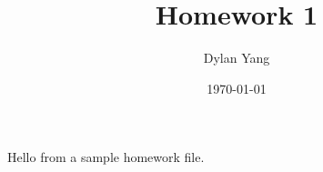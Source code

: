 \documentclass[../main.tex]{subfiles}
\title{Homework 1}
\author{Dylan Yang}
\date{\today}
\begin{document}
\makeatletter
{}
\makeatother

Hello from a sample homework file.
\end{document}
